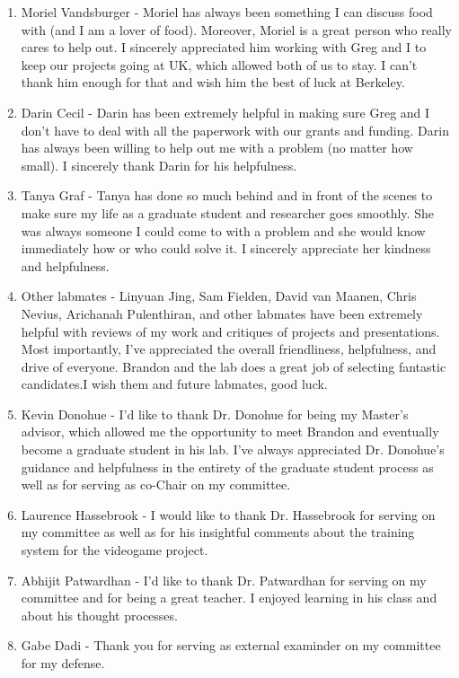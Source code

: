 \begin{enumerate}
	\item Moriel Vandsburger - Moriel has always been something I can discuss food with (and I am a lover of food). Moreover, Moriel is a great person who really cares to help out. I sincerely appreciated him working with Greg and I to keep our projects going at UK, which allowed both of us to stay. I can't thank him enough for that and wish him the best of luck at Berkeley.
	\item Darin Cecil - Darin has been extremely helpful in making sure Greg and I don't have to deal with all the paperwork with our grants and funding. Darin has always been willing to help out me with a problem (no matter how small). I sincerely thank Darin for his helpfulness.
	\item Tanya Graf - Tanya has done so much behind and in front of the scenes to make sure my life as a graduate student and researcher goes smoothly. She was always someone I could come to with a problem and she would know immediately how or who could solve it. I sincerely appreciate her kindness and helpfulness.
	\item Other labmates - Linyuan Jing, Sam Fielden, David van Maanen, Chris Nevius, Arichanah Pulenthiran, and other labmates have been extremely helpful with reviews of my work and critiques of projects and presentations. Most importantly, I've appreciated the overall friendliness, helpfulness, and drive of everyone. Brandon and the lab does a great job of selecting fantastic candidates.I wish them and future labmates, good luck.
	\item Kevin Donohue - I'd like to thank Dr. Donohue for being my Master's advisor, which allowed me the opportunity to meet Brandon and eventually become a graduate student in his lab. I've always appreciated Dr. Donohue's guidance and helpfulness in the entirety of the graduate student process as well as for serving as co-Chair on my committee.
	\item Laurence Hassebrook - I would like to thank Dr. Hassebrook for serving on my committee as well as for his insightful comments about the training system for the videogame project.
	\item Abhijit Patwardhan - I'd like to thank Dr. Patwardhan for serving on my committee and for being a great teacher. I enjoyed learning in his class and about his thought processes.
	\item Gabe Dadi - Thank you for serving as external examinder on my committee for my defense.
\end{enumerate}

